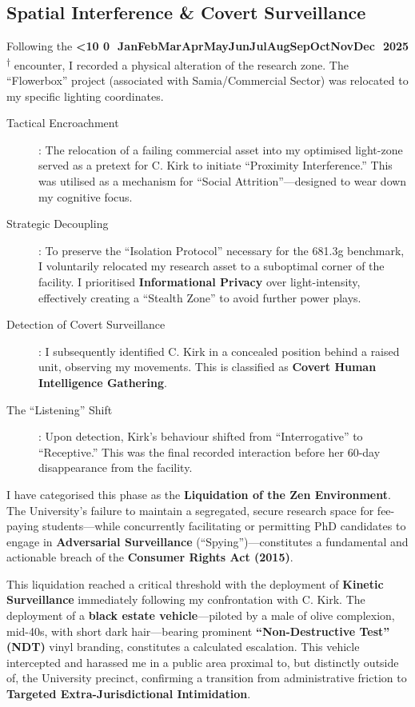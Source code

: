 \documentclass{EMBASSY}
\DeclareRobustCommand{\gmt}[3]{%
    \texorpdfstring{%
        {\color{DateGold}\textbf{%
            \ifnum#1<10 0\fi#1\,\textperiodcentered\,%
            \ifcase#2\or Jan\or Feb\or Mar\or Apr\or May\or Jun\or Jul\or Aug\or Sep\or Oct\or Nov\or Dec\fi
            \,\textperiodcentered\,20#3%
            \textsuperscript{$\dagger$}%
        }}%
    }{%
        (#1/#2/#3)%
    }%
}
\begin{document}
\subsection{Spatial Interference \& Covert Surveillance}
Following the \gmt{4}{11}{25} encounter, I recorded a physical alteration of the research zone. The ``Flowerbox'' project (associated with Samia/Commercial Sector) was relocated to my specific lighting coordinates.

\begin{description}
	\item[Tactical Encroachment]: The relocation of a failing commercial asset into my optimised light-zone served as a pretext for C. Kirk to initiate ``Proximity Interference.'' This was utilised as a mechanism for ``Social Attrition''---designed to wear down my cognitive focus.
	\item[Strategic Decoupling]: To preserve the ``Isolation Protocol'' necessary for the 681.3g benchmark, I voluntarily relocated my research asset to a suboptimal corner of the facility. I prioritised \textbf{Informational Privacy} over light-intensity, effectively creating a ``Stealth Zone'' to avoid further power plays.
	\item[Detection of Covert Surveillance]: I subsequently identified C. Kirk in a concealed position behind a raised unit, observing my movements. This is classified as \textbf{Covert Human Intelligence Gathering}.
	\item[The ``Listening'' Shift]: Upon detection, Kirk’s behaviour shifted from ``Interrogative'' to ``Receptive.'' This was the final recorded interaction before her 60-day disappearance from the facility.
\end{description}

\noindent I have categorised this phase as the \textbf{Liquidation of the Zen Environment}. The University's failure to maintain a segregated, secure research space for fee-paying students—while concurrently facilitating or permitting PhD candidates to engage in \textbf{Adversarial Surveillance} (``Spying'')---constitutes a fundamental and actionable breach of the \textbf{Consumer Rights Act (2015)}.

This liquidation reached a critical threshold with the deployment of \textbf{Kinetic Surveillance} immediately following my confrontation with C. Kirk. The deployment of a \textbf{black estate vehicle}---piloted by a male of olive complexion, mid-40s, with short dark hair---bearing prominent \textbf{``Non-Destructive Test'' (NDT)} vinyl branding, constitutes a calculated escalation. This vehicle intercepted and harassed me in a public area proximal to, but distinctly outside of, the University precinct, confirming a transition from administrative friction to \textbf{Targeted Extra-Jurisdictional Intimidation}.
\end{document}
